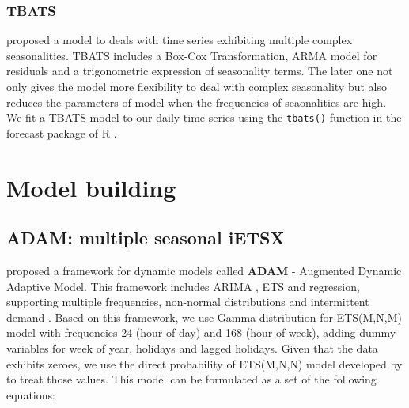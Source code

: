 \documentclass[]{elsarticle} %
\begin{document}
\hypertarget{tbats}{%
\subsubsection{TBATS}\label{tbats}}

\citet{de2011forecasting} proposed a model to deals with time series exhibiting multiple complex seasonalities. TBATS includes a Box-Cox Transformation, ARMA model for residuals and a trigonometric expression of seasonality terms. The later one not only gives the model more flexibility to deal with complex seasonality but also reduces the parameters of model when the frequencies of seaonalities are high. We fit a TBATS model to our daily time series using the \texttt{tbats()} function in the forecast package of R \citep{forecastpackage2020}.

\hypertarget{model}{%
\section{Model building}\label{model}}

\hypertarget{adam-multiple-seasonal-ietsx}{%
\subsection{ADAM: multiple seasonal iETSX}\label{adam-multiple-seasonal-ietsx}}

\citet{SvetunkovAdam2021} proposed a framework for dynamic models called \textbf{ADAM} - Augmented Dynamic Adaptive Model. This framework includes ARIMA \citep{Box1976}, ETS \citep{Hyndman2008b} and regression, supporting multiple frequencies, non-normal distributions and intermittent demand \citep{Svetunkov2019a}. Based on this framework, we use Gamma distribution for ETS(M,N,M) model with frequencies 24 (hour of day) and 168 (hour of week), adding dummy variables for week of year, holidays and lagged holidays. Given that the data exhibits zeroes, we use the direct probability of ETS(M,N,N) model developed by \citet{Svetunkov2019a} to treat those values. This model can be formulated as a set of the following equations:
\end{document}
